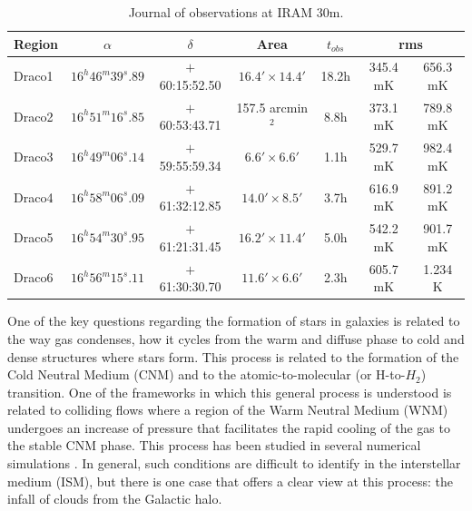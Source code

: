 \documentclass[traditabstract]{aa}
\newcommand{\tfm}[1]{\tablefootmark{#1}}
\begin{document}
\begin{table}[h]
  \centering
  \footnotesize
  \caption{\label{table:rms} Journal of observations at IRAM 30m.}
  \begin{tabular}{lcccccc}
    \hline \hline
    Region &      $\alpha$       &    $\delta$    &        Area         & $t_{obs}$ \tfm{a} & \multicolumn{2}{c}{rms \tfm{b}} \\ \hline 
    Draco1 & $16^h 46^m 39^s.89$ & $+$60:15:52.50 & $16.4'\times 14.4'$ &       18.2h       &    345.4 mK    &    656.3 mK    \\
    Draco2 & $16^h 51^m 16^s.85$ & $+$60:53:43.71 &  157.5 arcmin$^2$   &        8.8h       &    373.1 mK    &    789.8 mK    \\
    Draco3 & $16^h 49^m 06^s.14$ & $+$59:55:59.34 &  $6.6'\times 6.6'$  &        1.1h       &    529.7 mK    &    982.4 mK    \\
    Draco4 & $16^h 58^m 06^s.09$ & $+$61:32:12.85 & $14.0'\times 8.5'$  &        3.7h       &    616.9 mK    &    891.2 mK    \\
    Draco5 & $16^h 54^m 30^s.95$ & $+$61:21:31.45 & $16.2'\times 11.4'$ &        5.0h       &    542.2 mK    &    901.7 mK    \\
    Draco6 & $16^h 56^m 15^s.11$ & $+$61:30:30.70 & $11.6'\times 6.6'$  &        2.3h       &    605.7 mK    &    1.234 K     \\ \hline
  \end{tabular}
\end{table}

   One of the key questions regarding the formation of stars in galaxies is related to the way gas condenses, how it cycles from the warm and diffuse phase to cold and dense structures where stars form. This process is related to the formation of the Cold Neutral Medium (CNM) and to the atomic-to-molecular (or H-to-$H_2$) transition. 
One of the frameworks in which this general process is understood is related to colliding flows where a region of the Warm Neutral Medium (WNM) undergoes an increase of pressure that facilitates the rapid cooling of the gas to the stable CNM phase. This process has been studied in several numerical simulations \citep{Hennebelle_1999,Audit_2005,Vazquez_2006,Hennebelle_2007,Inoue_2009,Saury_2014}. In general, such conditions are difficult to identify in the interstellar medium (ISM), but there is one case that offers a clear view at this process: the infall of clouds from the Galactic halo.
\end{document}
